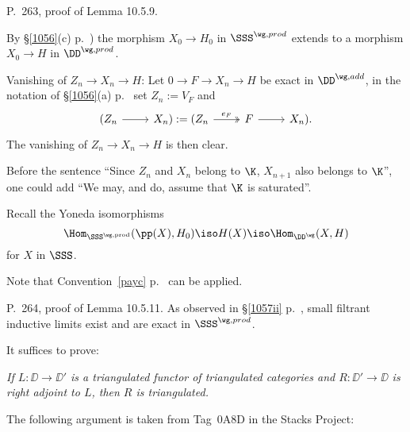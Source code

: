 \documentclass[12pt]{article}
\theoremstyle{remark}
\theoremstyle{definition}
\begin{document}
\begin{s} P.~263, proof of Lemma 10.5.9.

By \S\ref{1056}(c) p.~) the morphism $X_0\to H_0$ in $\SSS^{\wg,prod}$ extends to a morphism $X_0\to H$ in $\DD^{\wg,prod}$.

Vanishing of $Z_n\to X_n\to H$: Let $0\to F\to X_n\to H$ be exact in $\DD^{\wg,add}$, in the notation of \S\ref{1056}(a) p.~ set $Z_n:=V_F$ and 
$$
\begin{tikzcd}
(Z_n\ar[r]&X_n):=(Z_n\ar[r,"e_F",twoheadrightarrow]&F\ar[r]&X_n).
\end{tikzcd}
$$
The vanishing of $Z_n\to X_n\to H$ is then clear.

Before the sentence ``Since $Z_n$ and $X_n$ belong to $\K$, $X_{n+1}$ also belongs to $\K$'', one could add ``We may, and do, assume that $\K$ is saturated''.

Recall the Yoneda isomorphisms 
$$
\Hom_{\SSS^{\wg,\text{prod}}}(\pp(X),H_0)\iso H(X)\iso\Hom_{\DD^\wg}(X,H)
$$ 
for $X$ in $\SSS$.

Note that Convention~\ref{payc} p.~ can be applied.
\end{s}

%

\begin{s}
P.~264, proof of Lemma 10.5.11. As observed in \S\ref{1057ii} p.~, small filtrant inductive limits exist and are exact in $\SSS^{\wg,prod}$.
\end{s}



It suffices to prove:

\nn\emph{If $L:\DD\to\DD'$ is a triangulated functor of triangulated categories and $R:\DD'\to\DD$ is right adjoint to $L$, then $R$ is triangulated.} 

The following argument is taken from Tag~0A8D in the Stacks Project:\bigskip
\end{document}
